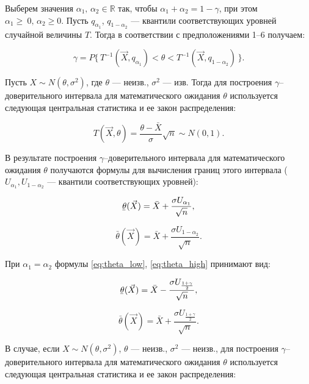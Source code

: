 Выберем значения $\alpha_1, \, \alpha_2 \in \mathbb{R}$ так, чтобы $\alpha_1 + \alpha_2 = 1 - \gamma$, при этом $\alpha_1 \geq~0, \, \alpha_2 \geq 0$.
Пусть $q_{\alpha_1}$, $q_{1 - \alpha_2}$ --- квантили соответствующих уровней случайной величины $T$.
Тогда в соответствии с предположениями 1--6 получаем: 

\begin{equation}
	\gamma = P\{ \, T^{-1}(\vec{X}, q_{\alpha_1}) < \theta < T^{-1}(\vec{X}, q_{1 - \alpha_2}) \, \}.
\end{equation}

Пусть $X \sim N(\theta, \sigma^2)$, где $\theta$ --- неизв., $\sigma^2$ --- изв.
Тогда для построения $\gamma$--доверительного интервала для математического ожидания $\theta$ используется следующая центральная статистика и ее закон распределения:

\begin{equation}
	T(\vec{X}, \theta) = \frac{\theta - \bar{X}}{\sigma}\sqrt{n} \sim N(0, 1).
\end{equation}

В результате построения $\gamma$--доверительного интервала для математического ожидания $\theta$ получаются формулы для вычисления границ этого интервала ($U_{\alpha_1}, U_{1 - \alpha_2}$ --- квантили соответствующих уровней):

\begin{equation}\label{eq:theta_low}
	\ubar{\theta}(\vec{X}) = \bar{X} + \frac{\sigma U_{\alpha_1}}{\sqrt{n}},
\end{equation}

\begin{equation}\label{eq:theta_high}
	\bar{\theta}(\vec{X}) = \bar{X} + \frac{\sigma U_{1 - \alpha_2}}{\sqrt{n}}.
\end{equation}

При $\alpha_1 = \alpha_2$ формулы \ref{eq:theta_low}, \ref{eq:theta_high} принимают вид:

\begin{equation}
	\ubar{\theta}(\vec{X}) = \bar{X} - \frac{\sigma U_{ \frac{1 + \gamma}{2} } }{ \sqrt{n} },
\end{equation}

\begin{equation}
	\bar{\theta}(\vec{X}) = \bar{X} + \frac{\sigma U_{ \frac{1 + \gamma}{2} } }{ \sqrt{n} }.
\end{equation}

В случае, если $X \sim N(\theta, \sigma^2)$, $\theta$ --- неизв., $\sigma^2$ --- неизв., для построения $\gamma$--доверительного интервала для математического ожидания $\theta$ используется следующая центральная статистика и ее закон распределения:

